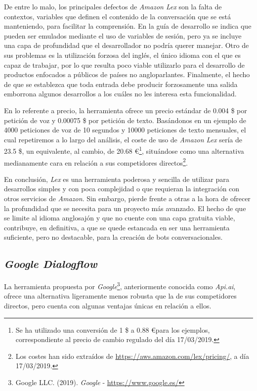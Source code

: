 \documentclass[11pt,spanish,listoffigures]{tfgetsinf}
\begin{document}
De entre lo malo, los principales defectos de \textit{Amazon Lex} son la falta de contextos, variables que definen el contenido de la conversación que se está manteniendo, para facilitar la comprensión. En la guía de desarrollo se indica que pueden ser emulados mediante el uso de variables de sesión, pero ya se incluye una capa de profundidad que el desarrollador no podría querer manejar. Otro de sus problemas es la utilización forzosa del inglés, el único idioma con el que es capaz de trabajar, por lo que resulta poco viable utilizarlo para el desarrollo de productos enfocados a públicos de países no angloparlantes. Finalmente, el hecho de que se establezca que toda entrada debe producir forzosamente una salida emborrona algunos desarrollos a los cuáles no les interesa esta funcionalidad.

En lo referente a precio, la herramienta ofrece un precio estándar de 0.004 \$ por petición de voz y 0.00075 \$ por petición de texto. Basándonos en un ejemplo de 4000 peticiones de voz de 10 segundos y 10000 peticiones de texto mensuales, el cual repetiremos a lo largo del análisis, el coste de uso de \textit{Amazon Lex} sería de 23.5 \$, un equivalente, al cambio, de 20.68 \euro\footnote{Se ha utilizado una conversión de 1 \$ a 0.88 \euro para los ejemplos, correspondiente al precio de cambio regulado del día 17/03/2019.}, situándose como una alternativa medianamente cara en relación a sus competidores directos\footnote{Los costes han sido extraídos de \url{https://aws.amazon.com/lex/pricing/}, a día 17/03/2019.}.

En conclusión, \textit{Lex} es una herramienta poderosa y sencilla de utilizar para desarrollos simples y con poca complejidad o que requieran la integración con otros servicios de \textit{Amazon}. Sin embargo, pierde frente a otras a la hora de ofrecer la profundidad que se necesita para un proyecto más avanzado. El hecho de que se limite al idioma anglosajón y que no cuente con una capa gratuita viable, contribuye, en definitiva, a que se quede estancada en ser una herramienta suficiente, pero no destacable, para la creación de bots conversacionales.

\subsection{\textit{Google Dialogflow}}
\label{sec:google-dialogflow}

La herramienta propuesta por \textit{Google}\footnote{Google LLC. (2019). \textit{Google} - \url{https://www.google.es/}}, anteriormente conocida como \textit{Api.ai}, ofrece una alternativa ligeramente menos robusta que la de sus competidores directos, pero cuenta con algunas ventajas únicas en relación a ellos. 
\end{document}
